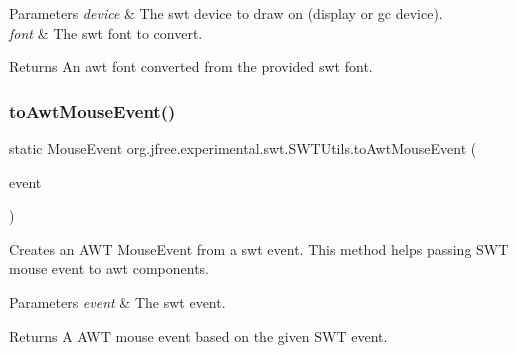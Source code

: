 \begin{DoxyParams}{Parameters}
{\em device} & The swt device to draw on (display or gc device). \\
\hline
{\em font} & The swt font to convert. \\
\hline
\end{DoxyParams}
\begin{DoxyReturn}{Returns}
An awt font converted from the provided swt font. 
\end{DoxyReturn}
\mbox{\label{classorg_1_1jfree_1_1experimental_1_1swt_1_1_s_w_t_utils_a65873a6e76391c4a773e1c62e438d089}} 
\subsubsection{\texorpdfstring{to\+Awt\+Mouse\+Event()}{toAwtMouseEvent()}}
{\footnotesize\ttfamily static Mouse\+Event org.\+jfree.\+experimental.\+swt.\+S\+W\+T\+Utils.\+to\+Awt\+Mouse\+Event (\begin{DoxyParamCaption}\item[{org.\+eclipse.\+swt.\+events.\+Mouse\+Event}]{event }\end{DoxyParamCaption})\hspace{0.3cm}{\ttfamily [static]}}

Creates an A\+WT {\ttfamily Mouse\+Event} from a swt event. This method helps passing S\+WT mouse event to awt components. 
\begin{DoxyParams}{Parameters}
{\em event} & The swt event. \\
\hline
\end{DoxyParams}
\begin{DoxyReturn}{Returns}
A A\+WT mouse event based on the given S\+WT event. 
\end{DoxyReturn}
\mbox{\label{classorg_1_1jfree_1_1experimental_1_1swt_1_1_s_w_t_utils_a37dca36eab604131de7d92e9a033df38}} 
